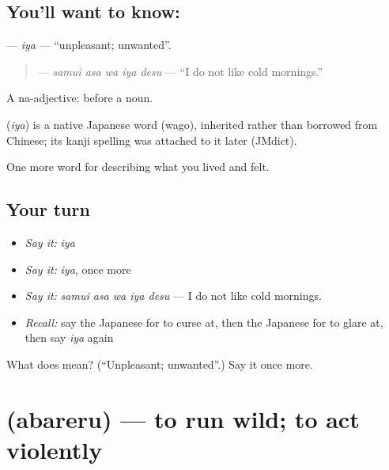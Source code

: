 \subsection*{You'll want to know: }
\textbf{} — \emph{iya} — \textquotedblleft{}unpleasant; unwanted\textquotedblright{}.

\begin{quote}
\textbf{  } — \emph{samui asa wa iya desu} — \textquotedblleft{}I do not like cold mornings.\textquotedblright{}
\end{quote}

A na-adjective:  before a noun.

\begin{cousinweb}
\textbf{} (\emph{iya}) is a native Japanese word (wago), inherited rather than borrowed from Chinese; its kanji spelling was attached to it later (JMdict).
\end{cousinweb}

\begin{grammarlens}[title={What you've built}]
One more word for describing what you lived and felt.
\end{grammarlens}

\subsection*{Your turn}
\begin{itemize}
\raggedright
  \item \emph{Say it:} \emph{iya}
  \item \emph{Say it:} \emph{iya}, once more
  \item \emph{Say it:} \emph{samui asa wa iya desu} — I do not like cold mornings.
  \item \emph{Recall:} say the Japanese for to curse at, then the Japanese for to glare at, then say \emph{iya} again
\end{itemize}

\begin{tcolorbox}[breakable,colback=teal!4,colframe=teal!35!black,title={Before you move on}]
What does  mean? (\textquotedblleft{}Unpleasant; unwanted\textquotedblright{}.) Say it once more.
\end{tcolorbox}
\section[\texorpdfstring{\ja{あばれる} (abareru)}{あばれる (abareru)}]{ (abareru) — to run wild; to act violently}

